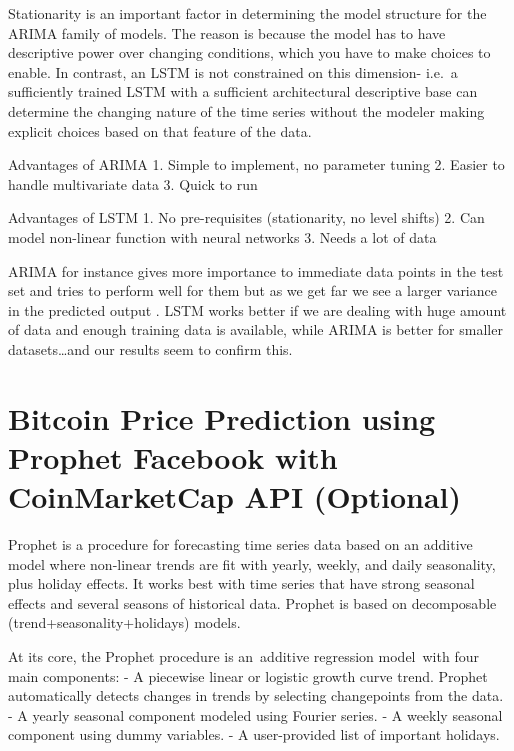 \documentclass[11pt]{article}
\begin{document}
    Stationarity is an important factor in determining the model structure
for the ARIMA family of models. The reason is because the model has to
have descriptive power over changing conditions, which you have to make
choices to enable. In contrast, an LSTM is not constrained on this
dimension- i.e.~a sufficiently trained LSTM with a sufficient
architectural descriptive base can determine the changing nature of the
time series without the modeler making explicit choices based on that
feature of the data.

    Advantages of ARIMA 1. Simple to implement, no parameter tuning 2.
Easier to handle multivariate data 3. Quick to run

    Advantages of LSTM 1. No pre-requisites (stationarity, no level shifts)
2. Can model non-linear function with neural networks 3. Needs a lot of
data

    ARIMA for instance gives more importance to immediate data points in the
test set and tries to perform well for them but as we get far we see a
larger variance in the predicted output . LSTM works better if we are
dealing with huge amount of data and enough training data is available,
while ARIMA is better for smaller datasets\ldots and our results seem to
confirm this.

    \hypertarget{bitcoin-price-prediction-using-prophet-facebook-with-coinmarketcap-api-optional}{%
\section{Bitcoin Price Prediction using Prophet Facebook with
CoinMarketCap API
(Optional)}\label{bitcoin-price-prediction-using-prophet-facebook-with-coinmarketcap-api-optional}}

    Prophet is a procedure for forecasting time series data based on an
additive model where non-linear trends are fit with yearly, weekly, and
daily seasonality, plus holiday effects. It works best with time series
that have strong seasonal effects and several seasons of historical
data. Prophet is based on decomposable (trend+seasonality+holidays)
models.

    At its core, the Prophet procedure is an~additive regression model~with
four main components: - A piecewise linear or logistic growth curve
trend. Prophet automatically detects changes in trends by selecting
changepoints from the data. - A yearly seasonal component modeled using
Fourier series. - A weekly seasonal component using dummy variables. - A
user-provided list of important holidays.
\end{document}
